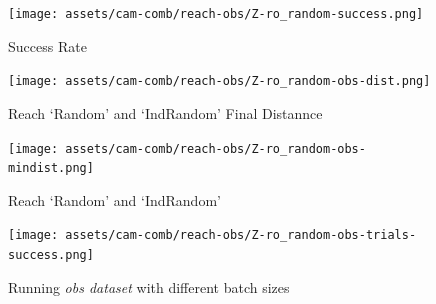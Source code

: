   \begin{figure}[H]
    \centering
    \texttt{[image: assets/cam-comb/reach-obs/Z-ro\_random-success.png]}
    \caption{Success Rate}
  \end{figure}

  \begin{figure}[htpb]
    \centering
    \texttt{[image: assets/cam-comb/reach-obs/Z-ro\_random-obs-dist.png]}
    \caption{Reach `Random' and `IndRandom' Final Distannce}
  \end{figure}

  \begin{figure}[htpb]
    \centering
    \texttt{[image: assets/cam-comb/reach-obs/Z-ro\_random-obs-mindist.png]}
    \caption{Reach `Random' and `IndRandom'}
  \end{figure}

  \begin{figure}[htpb]
    \centering
    \texttt{[image: assets/cam-comb/reach-obs/Z-ro\_random-obs-trials-success.png]}
    \caption{Running \emph{obs dataset} with different batch sizes}\label{apx:Z-ro_random-obs-trials-success}
  \end{figure}